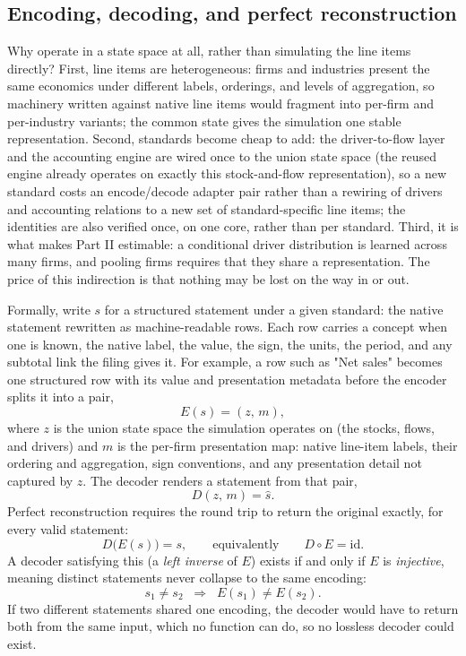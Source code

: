 \documentclass[11pt]{article}
\begin{document}
\subsection{Encoding, decoding, and perfect reconstruction}
\label{sec:reconstruction}
Why operate in a state space at all, rather than simulating the line items directly? First, line items are heterogeneous: firms and industries present the same economics under different labels, orderings, and levels of aggregation, so machinery written against native line items would fragment into per-firm and per-industry variants; the common state gives the simulation one stable representation. Second, standards become cheap to add: the driver-to-flow layer and the accounting engine are wired once to the union state space (the reused engine already operates on exactly this stock-and-flow representation), so a new standard costs an encode/decode adapter pair rather than a rewiring of drivers and accounting relations to a new set of standard-specific line items; the identities are also verified once, on one core, rather than per standard. Third, it is what makes Part II estimable: a conditional driver distribution is learned across many firms, and pooling firms requires that they share a representation. The price of this indirection is that nothing may be lost on the way in or out.

Formally, write $s$ for a structured statement under a given standard: the native statement rewritten as machine-readable rows. Each row carries a concept when one is known, the native label, the value, the sign, the units, the period, and any subtotal link the filing gives it. For example, a row such as "Net sales" becomes one structured row with its value and presentation metadata before the encoder splits it into a pair,
\begin{equation} E(s) = (z,\, m), \end{equation}
where $z$ is the union state space the simulation operates on (the stocks, flows, and drivers) and $m$ is the per-firm presentation map: native line-item labels, their ordering and aggregation, sign conventions, and any presentation detail not captured by $z$. The decoder renders a statement from that pair,
\begin{equation} D(z,\, m) = \hat{s}. \end{equation}
Perfect reconstruction requires the round trip to return the original exactly, for every valid statement:
\begin{equation} D\big(E(s)\big) = s, \qquad\text{equivalently}\qquad D \circ E = \mathrm{id}. \end{equation}
A decoder satisfying this (a \emph{left inverse} of $E$) exists if and only if $E$ is \emph{injective}, meaning distinct statements never collapse to the same encoding:
\begin{equation} s_1 \neq s_2 \;\;\Longrightarrow\;\; E(s_1) \neq E(s_2). \end{equation}
If two different statements shared one encoding, the decoder would have to return both from the same input, which no function can do, so no lossless decoder could exist.
\end{document}
